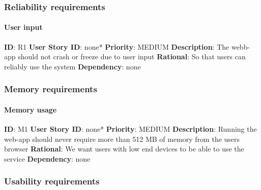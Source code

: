 \documentclass{article}
\begin{document}
\subsubsection{Reliability requirements}

\paragraph{User input}\label{req:}
\textbf{ID}: R1\newline
\textbf{User Story ID}: none* \newline
\textbf{Priority}: MEDIUM\newline
\textbf{Description}: The webb-app should not crash or freeze due to user input\newline
\textbf{Rational}: So that users can reliably use the system\newline
\textbf{Dependency}: none\newline

\subsubsection{Memory requirements}

\paragraph{Memory usage}\label{req:}
\textbf{ID}: M1 \newline
\textbf{User Story ID}: none*\newline
\textbf{Priority}: MEDIUM\newline
\textbf{Description}: Running the web-app should never require more than 512 MB of memory from the users browser\newline
\textbf{Rational}: We want users with low end devices to be able to use the service\newline
\textbf{Dependency}: none\newline

\subsubsection{Usability requirements}
\end{document}

